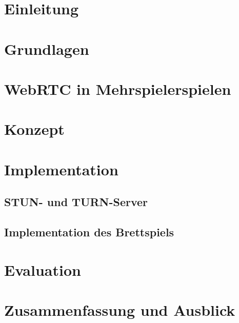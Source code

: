 \documentclass[oneside,11pt,a4paper,bibliography=totocnumbered,numbers=noenddot]{scrreprt}
\begin{document}
 					
\begin{titlepage}

\end{titlepage}

\thispagestyle{empty}
\cleardoublepage
{}




\cleardoublepage
{}			%
\begin{singlespace}

\chapter{Einleitung}
  

\chapter{Grundlagen}
  

\chapter{WebRTC in Mehrspielerspielen}
  

\chapter{Konzept}
  

\chapter{Implementation}
  
  \section{STUN- und TURN-Server}
  
  \section{Implementation des Brettspiels}
  

\chapter{Evaluation}
  

\chapter{Zusammenfassung und Ausblick}
  



  
  \clearpage
  
  \end{singlespace}
\end{document}
